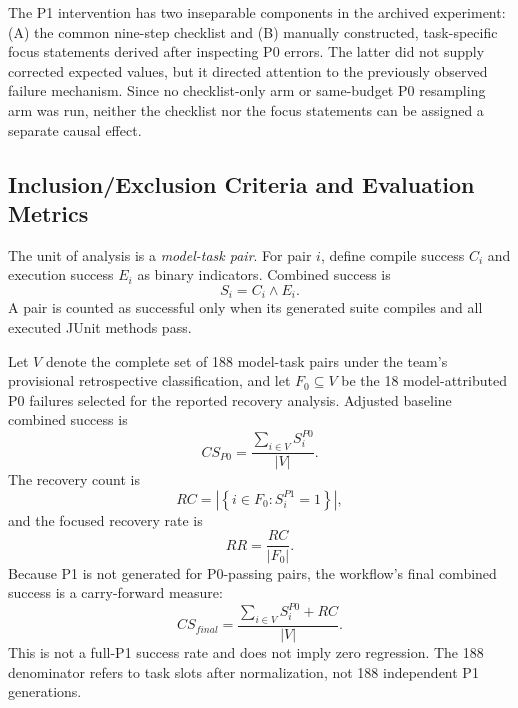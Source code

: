 \documentclass[conference]{IEEEtran}
\begin{document}
The P1 intervention has two inseparable components in the archived experiment: (A) the common nine-step checklist and (B) manually constructed, task-specific focus statements derived after inspecting P0 errors. The latter did not supply corrected expected values, but it directed attention to the previously observed failure mechanism. Since no checklist-only arm or same-budget P0 resampling arm was run, neither the checklist nor the focus statements can be assigned a separate causal effect.

\subsection{Inclusion/Exclusion Criteria and Evaluation Metrics}
The unit of analysis is a \emph{model-task pair}. For pair $i$, define compile success $C_i$ and execution success $E_i$ as binary indicators. Combined success is
\begin{equation}
S_i = C_i \land E_i.
\end{equation}
A pair is counted as successful only when its generated suite compiles and all executed JUnit methods pass.

Let $V$ denote the complete set of 188 model-task pairs under the team's provisional retrospective classification, and let $F_0 \subseteq V$ be the 18 model-attributed P0 failures selected for the reported recovery analysis. Adjusted baseline combined success is
\begin{equation}
CS_{P0} = \frac{\sum_{i\in V} S_i^{P0}}{|V|}.
\end{equation}
The recovery count is
\begin{equation}
RC = \left|\left\{i\in F_0 : S_i^{P1}=1\right\}\right|,
\end{equation}
and the focused recovery rate is
\begin{equation}
RR = \frac{RC}{|F_0|}.
\end{equation}
Because P1 is not generated for P0-passing pairs, the workflow's final combined success is a carry-forward measure:
\begin{equation}
CS_{final} = \frac{\sum_{i\in V} S_i^{P0} + RC}{|V|}.
\end{equation}
This is not a full-P1 success rate and does not imply zero regression. The 188 denominator refers to task slots after normalization, not 188 independent P1 generations.
\end{document}
